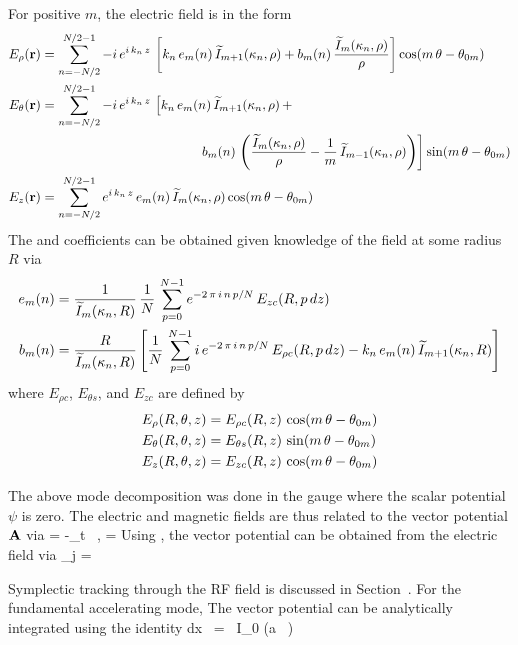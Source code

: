 For positive $m$, the electric field is in the form
\begin{align}
  E_\rho({\bf r}) &= \sum_{n=-N/2}^{N/2-1}
    -i \, e^{i \, k_n \, z} \, 
    \left[ 
    k_n \, e_m(n) \, \widetilde I_{m+1}(\kappa_n, \rho) +
    b_m(n) \, \frac{\widetilde I_m(\kappa_n, \rho)}{\rho}
    \right]
    \cos(m \, \theta - \theta_{0m}) \nonumber \\
  E_\theta({\bf r}) &= \sum_{n=-N/2}^{N/2-1} 
    -i \, e^{i \, k_n \, z} \, 
    \left[
    k_n \, e_m(n) \, \widetilde I_{m+1}(\kappa_n, \rho) \, + \right. \\
  & \left. \qquad \qquad \qquad \qquad \qquad \qquad
    b_m(n) \, \left( \frac{\widetilde I_m(\kappa_n, \rho)}{\rho} - 
    \frac{1}{m} \, \widetilde I_{m-1}(\kappa_n, \rho) \right)
    \right] 
    \sin(m \, \theta - \theta_{0m}) \nonumber \\
  E_z({\bf r}) &= \sum_{n=-N/2}^{N/2-1}e^{i \, k_n \, z} \, 
    e_m(n) \, \widetilde I_m(\kappa_n, \rho) \cos(m \, \theta - \theta_{0m}) \nonumber
\end{align}
The  and  coefficients can be obtained given knowledge of the field at some radius $R$ via
\begin{align}
  e_m(n) &= \frac{1}{\widetilde I_m(\kappa_n, R)} \, \frac{1}{N} \, \sum_{p=0}^{N-1}
    e^{-2 \, \pi \, i \, n \, p / N} \, E_{zc}(R, p \, dz) \nonumber \\
  b_m(n) &= \frac{R}{\widetilde I_m(\kappa_n, R)} \left[
    \frac{1}{N} \, \sum_{p=0}^{N-1}
    i \, e^{-2 \, \pi \, i \, n \, p / N} \, E_{\rho c}(R, p \, dz) -
    k_n \, e_m(n) \, \widetilde I_{m+1}(\kappa_n, R)
    \right]
\end{align}
where $E_{\rho c}$, $E_{\theta s}$, and $E_{z c}$ are defined by
\begin{align}
  E_\rho(R, \theta, z) &= E_{\rho c}(R, z) \, \cos(m \, \theta - \theta_{0m}) \nonumber \\
  E_\theta(R, \theta, z) &= E_{\theta s}(R, z) \, \sin(m \, \theta - \theta_{0m}) \\
  \label{erpze}
  E_z(R, \theta, z)    &= E_{z c}(R, z)    \, \cos(m \, \theta - \theta_{0m}) \nonumber
\end{align}

The above mode decomposition was done in the gauge where the scalar
potential $\psi$ is zero. The electric and magnetic fields are thus
related to the vector potential ${\bf A}$ via
\Begineq
  \bfE = -\partial_t \, \bfA, \qquad \bfB = \nabla \times \bfA
\Endeq
Using , the vector potential can be obtained from the
electric field via
\Begineq
  \bfA_j = 
  \label{aiew}
\Endeq
 
Symplectic tracking through the RF field is discussed in
Section~.  For the fundamental accelerating mode,
The vector potential can be analytically integrated using the identity
\Begineq
  \int dx \,  = 
   \, I_0 (a \, )
\Endeq

